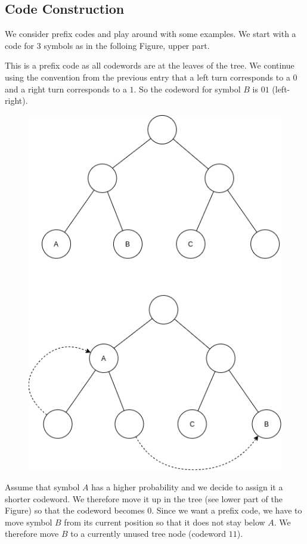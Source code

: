
\subsection{Code Construction}

We consider prefix codes and play around with some examples. We start with a code for $3$ symbols as in the folloing Figure, upper part.

This is a prefix code as all codewords are at the leaves of the tree. We continue using the convention from the previous entry that a left turn corresponds to a $0$ and a right turn corresponds to a $1$. So the codeword for symbol $B$ is $01$ (left-right).

\begin{figure}[H]
    \centering
    \includegraphics[scale=0.4]{images/2021-04-26-scenario_1.png}
\end{figure}

Assume that symbol $A$ has a higher probability and we decide to assign it a shorter codeword. We therefore move it up in the tree (see lower part of the Figure) so that the codeword becomes $0$. Since we want a prefix code, we have to move symbol $B$ from its current position so that it does not stay below $A$. We therefore move $B$ to a currently unused tree node (codeword $11$).

